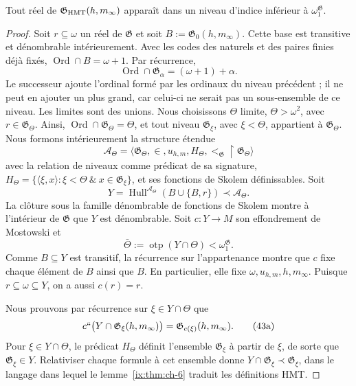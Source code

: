 \begin{lemma}
\label{ix:thm:ch-8}
Tout réel de
\(\mathfrak G_{\rm HMT}(h,m_\infty)\) apparaît dans un niveau d’indice inférieur à
\(\omega_1^{\mathfrak G}\).

\end{lemma}
\begin{proof}
Soit \(r\subseteq\omega\) un réel de \(\mathfrak G\) et soit
\(B:=\mathfrak G_0(h,m_\infty)\). Cette base est transitive et dénombrable
intérieurement. Avec les codes des naturels et des paires finies déjà fixés,
\(\operatorname{Ord}\cap B=\omega+1\). Par récurrence,
\[
 \operatorname{Ord}\cap\mathfrak G_\alpha=(\omega+1)+\alpha.
\]
Le successeur ajoute l’ordinal formé par les ordinaux du niveau précédent ;
il ne peut en ajouter un plus grand, car celui-ci ne serait pas un sous-ensemble de ce niveau. Les
limites sont des unions. Nous choisissons \(\Theta\) limite, \(\Theta>\omega^2\),
avec \(r\in\mathfrak G_\Theta\). Ainsi,
\(\operatorname{Ord}\cap\mathfrak G_\Theta=\Theta\), et tout niveau
\(\mathfrak G_\xi\), avec \(\xi<\Theta\), appartient à
\(\mathfrak G_\Theta\). Nous formons intérieurement la structure étendue
\[
 \mathcal A_\Theta=
 \langle\mathfrak G_\Theta,\in,u_{h,m},
         H_\Theta,<_{\mathfrak G}\!\upharpoonright\mathfrak G_\Theta\rangle
\]
avec la relation de niveaux comme prédicat de sa signature,
\(H_\Theta=\{\langle\xi,x\rangle:\xi<\Theta\ \&\
x\in\mathfrak G_\xi\}\), et ses fonctions de Skolem définissables. Soit
\[
 Y=\operatorname{Hull}^{\mathcal A_\Theta}
   (B\cup\{B,r\})\prec\mathcal A_\Theta .
\]
La clôture sous la famille dénombrable de fonctions de Skolem montre à l’intérieur
de \(\mathfrak G\) que \(Y\) est dénombrable. Soit
\(c:Y\rightarrow M\) son effondrement de Mostowski et
\[
 \bar\Theta:=\operatorname{otp}(Y\cap\Theta)
 <\omega_1^{\mathfrak G}.
\]
Comme \(B\subseteq Y\) est transitif, la récurrence sur l’appartenance montre
que \(c\) fixe chaque élément de \(B\) ainsi que \(B\). En particulier,
elle fixe \(\omega,u_{h,m},h,m_\infty\). Puisque
\(r\subseteq\omega\subseteq Y\), on a aussi \(c(r)=r\).

Nous prouvons par récurrence sur \(\xi\in Y\cap\Theta\) que
\[
 c``\bigl(Y\cap\mathfrak G_\xi(h,m_\infty)\bigr)
 =\mathfrak G_{c(\xi)}(h,m_\infty).
\tag{43a}\label{ix:eq:ch-condensacion}
\]
Pour \(\xi\in Y\cap\Theta\), le prédicat \(H_\Theta\) définit
l’ensemble \(\mathfrak G_\xi\) à partir de \(\xi\), de sorte que
\(\mathfrak G_\xi\in Y\). Relativiser chaque formule à cet ensemble donne
\(Y\cap\mathfrak G_\xi\prec\mathfrak G_\xi\), dans le langage dans lequel
le lemme~\ref{ix:thm:ch-6} traduit les définitions HMT.


\end{proof}
